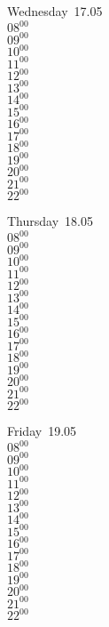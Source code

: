 \documentclass[11pt,a4paper]{book}\usepackage[]{graphicx}\usepackage[]{color}
\begin{document}
\begin{weekdaybox}
  Wednesday~17.05\\
  { 
  \vfill
  $08^{00}$\\
$09^{00}$\\
$10^{00}$\\
$11^{00}$\\
$12^{00}$\\
$13^{00}$\\
$14^{00}$\\
$15^{00}$\\
$16^{00}$\\
$17^{00}$\\
$18^{00}$\\
$19^{00}$\\
$20^{00}$\\
$21^{00}$\\
$22^{00}$\\
  }
\end{weekdaybox}
\clearpage
\begin{headerbox}
\end{headerbox}
\begin{weekdaybox}
  Thursday~18.05\\
  { 
  \vfill
  $08^{00}$\\
$09^{00}$\\
$10^{00}$\\
$11^{00}$\\
$12^{00}$\\
$13^{00}$\\
$14^{00}$\\
$15^{00}$\\
$16^{00}$\\
$17^{00}$\\
$18^{00}$\\
$19^{00}$\\
$20^{00}$\\
$21^{00}$\\
$22^{00}$\\
  }
\end{weekdaybox} 
\begin{weekdaybox}
  Friday~19.05\\
  { 
  \vfill
  $08^{00}$\\
$09^{00}$\\
$10^{00}$\\
$11^{00}$\\
$12^{00}$\\
$13^{00}$\\
$14^{00}$\\
$15^{00}$\\
$16^{00}$\\
$17^{00}$\\
$18^{00}$\\
$19^{00}$\\
$20^{00}$\\
$21^{00}$\\
$22^{00}$\\
  }
\end{weekdaybox}
\end{document}
